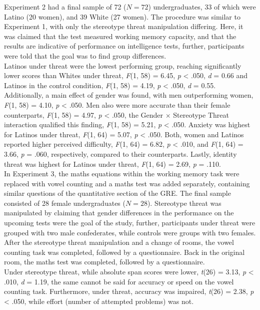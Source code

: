 \documentclass[
  stu,floatsintext]{apa7}
\begin{document}
Experiment 2 had a final sample of 72 (\(N = 72\)) undergraduates, 33 of which were Latino (20 women), and 39 White (27 women).
The procedure was similar to Experiment 1, with only the stereotype threat manipulation differing.
Here, it was claimed that the test measured working memory capacity, and that the results are indicative of performance on intelligence tests, further, participants were told that the goal was to find group differences.\\
Latinos under threat were the lowest performing group, reaching significantly lower scores than Whites under threat, \emph{F}(1, 58) = 6.45, \emph{p} \textless{} .050, \emph{d} = 0.66 and Latinos in the control condition, \emph{F}(1, 58) = 4.19, \emph{p} \textless{} .050, \emph{d} = 0.55.
Additionally, a main effect of gender was found, with men outperforming women, \emph{F}(1, 58) = 4.10, \emph{p} \textless{} .050.
Men also were more accurate than their female counterparts, \emph{F}(1, 58) = 4.97, \emph{p} \textless{} .050, the Gender \(\times\) Stereotype Threat interaction qualified this finding, \emph{F}(1, 58) = 5.21, \emph{p} \textless{} .050.
Anxiety was highest for Latinos under threat, \emph{F}(1, 64) = 5.07, \emph{p} \textless{} .050.
Both, women and Latinos reported higher perceived difficulty, \emph{F}(1, 64) = 6.82, \emph{p} \textless{} .010, and \emph{F}(1, 64) = 3.66, \emph{p} = .060, respectively, compared to their counterparts.
Lastly, identity threat was highest for Latinos under threat, \emph{F}(1, 64) = 2.69, \emph{p} = .110.\\
In Experiment 3, the maths equations within the working memory task were replaced with vowel counting and a maths test was added separately, containing similar questions of the quantitative section of the GRE.
The final sample consisted of 28 female undergraduates (\(N = 28\)).
Stereotype threat was manipulated by claiming that gender differences in the performance on the upcoming tests were the goal of the study, further, participants under threat were grouped with two male confederates, while controls were groups with two females.
After the stereotype threat manipulation and a change of rooms, the vowel counting task was completed, followed by a questionnaire.
Back in the original room, the maths test was completed, followed by a questionnaire.\\
Under stereotype threat, while absolute span scores were lower, \emph{t}(26) = 3.13, \emph{p} \textless{} .010, \emph{d} = 1.19, the same cannot be said for accuracy or speed on the vowel counting task.
Furthermore, under threat, accuracy was impaired, \emph{t}(26) = 2.38, \emph{p} \textless{} .050, while effort (number of attempted problems) was not.
\end{document}
